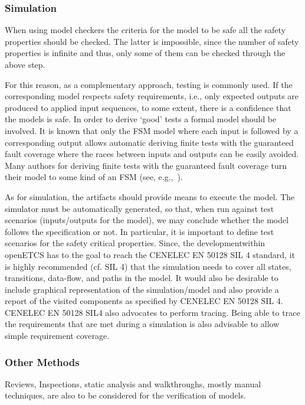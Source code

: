 \documentclass{template/openetcs_article}
\begin{document}
\subsubsection{Simulation}

When using model checkers the criteria for the model to be safe all the safety properties should be checked. The latter is impossible, since the number of safety properties is infinite and thus, only some of them can be checked through the above step.

For this reason, as a complementary approach, testing is commonly used. If the corresponding model respects safety requirements, i.e., only expected outputs are produced to applied input sequences, to some extent, there is a confidence that the models is safe. In order to derive ‘good’ tests a formal model should be involved. It is known that only the FSM model where each input is followed by a corresponding output allows automatic deriving finite tests with the guaranteed fault coverage where the races between inputs and outputs can be easily avoided.  Many authors for deriving finite tests with the guaranteed fault coverage turn their model to some kind of an FSM (see, e.g.,~\cite{springintveld2001testing,zymc11,Gromov2009}). 

As for simulation, the artifacts should provide means to execute the model.  The simulator must be automatically generated, so that, when run against test scenarios (inputs/outputs for the model), we may conclude whether the model follows the specification or not. In particular, it is important to define test scenarios for the safety critical properties. Since, the developmentwithin openETCS has to the goal to reach the CENELEC EN 50128 SIL 4 standard, it is highly recommended (cf. SIL 4) that the simulation needs to cover all states, transitions, data-flow, and paths in the model. It would also be desirable to include graphical representation of the simulation/model and also provide a report of the visited components as specified by CENELEC EN 50128 SIL 4. CENELEC EN 50128 SIL4 also advocates to perform tracing. Being able to trace the requirements that are met during a simulation is also advisable to allow simple requirement coverage.

\subsubsection{Other Methods}

Reviews, Inspections, static analysis and walkthroughs, mostly manual techniques, are also to be considered for the verification of models. 
\end{document}
